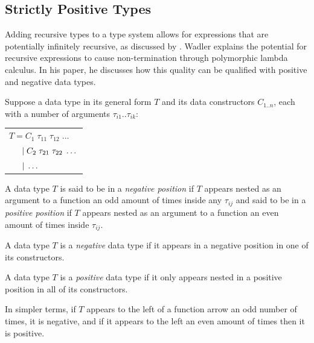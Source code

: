 \subsection{Strictly Positive Types}

Adding recursive types to a type system allows for expressions that are potentially infinitely recursive,
as discussed by \citet{RecursiveTypesForFree}. Wadler explains the potential for recursive expressions
to cause non-termination through polymorphic lambda calculus. In his paper, he discusses how this
quality can be qualified with positive and negative data types.

Suppose a data type in its general form $T$ and its data constructors $C_{1..n}$, each with a number of arguments 
$\tau_{i1}..\tau_{ik}$:

\begin{center}
    \begin{tabular}{l}
        $T = C_1\; \tau_{11} \; \tau_{12} \; \dots$ \\
        $\hspace{1.5em} \vert\; C_2\; \tau_{21} \; \tau_{22} \; \dots$ \\
        $\hspace{1.5em} \vert\; \dots$ \\
    \end{tabular} 
\end{center}

\theoremstyle{definition}
\begin{definition}
    A data type $T$ is said to be in a \textit{negative position} if $T$ appears nested as an argument
    to a function an odd amount of times inside any $\tau_{ij}$ and said to be in a \textit{positive position}
    if $T$ appears nested as an argument to a function an even amount of times inside $\tau_{ij}$.
\end{definition}

\theoremstyle{definition}
\begin{definition}
    A data type $T$ is a \textit{negative} data type if it appears in a negative position 
    in one of its constructors.
\end{definition}

\theoremstyle{definition}
\begin{definition}
    A data type $T$ is a \textit{positive} data type if it only appears nested in a positive position
    in all of its constructors.
\end{definition}

In simpler terms, if $T$ appears to the left of a function arrow an odd number of times, it is negative,
and if it appears to the left an even amount of times then it is positive.

